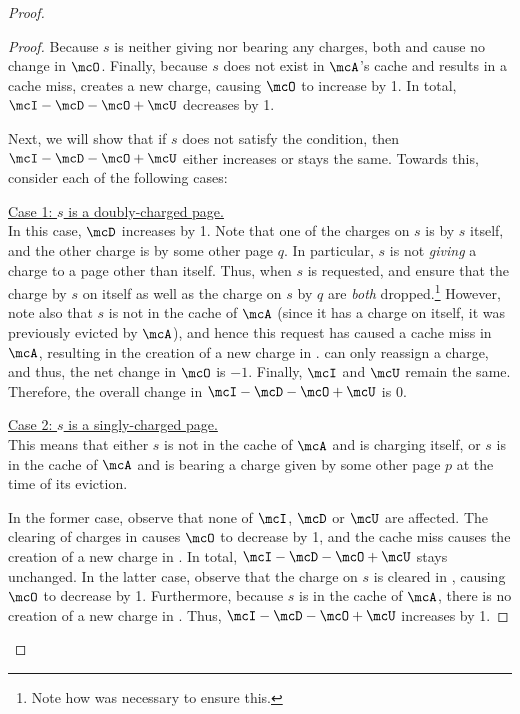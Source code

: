 \begin{proof}
\begin{proof}
        Because $s$ is neither giving nor bearing any charges, both  and  cause no change in $\mcO$. Finally, because $s$ does not exist in $\mcA$'s cache and results in a cache miss,  creates a new charge, causing $\mcO$ to increase by 1. In total, $\mcI-\mcD-\mcO+\mcU$ decreases by 1.

        \smallskip
        Next, we will show that if $s$ does not satisfy the condition, then $\mcI-\mcD-\mcO+\mcU$ either increases or stays the same. Towards this, consider each of the following cases: 
        
        \medskip\noindent\underline{Case 1: $s$ is a doubly-charged page.} \\
        In this case, $\mcD$ increases by 1. Note that one of the charges on $s$ is by $s$ itself, and the other charge is by some other page $q$. In particular, $s$ is not \textit{giving} a charge to a page other than itself. Thus, when $s$ is requested,  and  ensure that the charge by $s$ on itself as well as the charge on $s$ by $q$ are \textit{both} dropped.\footnote{Note how  was necessary to ensure this.} However, note also that $s$ is not in the cache of $\mcA$ (since it has a charge on itself, it was previously evicted by $\mcA$), and hence this request has caused a cache miss in $\mcA$, resulting in the creation of a new charge in .  can only reassign a charge, and thus, the net change in $\mcO$ is $-1$. Finally, $\mcI$ and $\mcU$ remain the same. Therefore, the overall change in $\mcI - \mcD - \mcO + \mcU$ is 0. \medskip
        
        \noindent\underline{Case 2: $s$ is a singly-charged page.} \\
        This means that either $s$ is not in the cache of $\mcA$ and is charging itself, or $s$ is in the cache of $\mcA$ and is bearing a charge given by some other page $p$ at the time of its eviction. 
        
        In the former case, observe that none of $\mcI$, $\mcD$ or $\mcU$ are affected. The clearing of charges in  causes $\mcO$ to decrease by 1, and the cache miss causes the creation of a new charge in . In total, $\mcI-\mcD-\mcO+\mcU$ stays unchanged.
        In the latter case, observe that the charge on $s$ is cleared in , causing $\mcO$ to decrease by 1. Furthermore, because $s$ is in the cache of $\mcA$, there is no creation of a new charge in . Thus, $\mcI-\mcD-\mcO+\mcU$ increases by 1.


\end{proof}
\end{proof}
